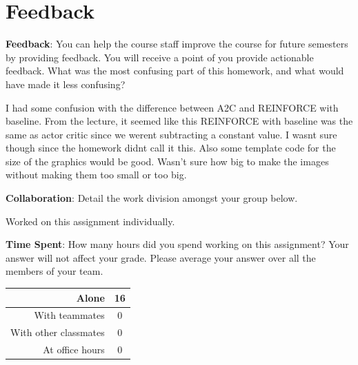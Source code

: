 \documentclass[12pt]{article}
\begin{document}
\clearpage
\section*{Feedback}

\textbf{Feedback}: You can help the course staff improve the course for future semesters by providing feedback. You will receive a point of you provide actionable feedback. What was the most confusing part of this homework, and what would have made it less confusing?
\begin{solution}[height=4cm]
    I had some confusion with the difference between A2C and REINFORCE with baseline. From the lecture, it seemed like this REINFORCE with baseline was the same as actor critic since we werent subtracting a constant value. I wasnt sure though since the homework didnt call it this. Also some template code for the size of the graphics would be good. Wasn't sure how big to make the images without making them too small or too big.
\end{solution}

\textbf{Collaboration}: Detail the work division amongst your group below.
\begin{solution}[height=4cm]
    Worked on this assignment individually.
\end{solution}

\noindent\textbf{Time Spent}: How many hours did you spend working on this assignment? Your answer will not affect your grade. Please average your answer over all the members of your team.
\begin{solution}[height=4cm]
\begin{table}[H]
    \centering
    \begin{tabular}{r|c}
        Alone &  \hspace{3em} 16 %
        \\ \hline
        With teammates & \hspace{3em} 0  %
        \\ \hline
        With other classmates & \hspace{3em} 0 %
        \\ \hline
        At office hours & \hspace{3em} 0 %
        \\ \hline
    \end{tabular}
\end{table}
\end{solution}
\end{document}

